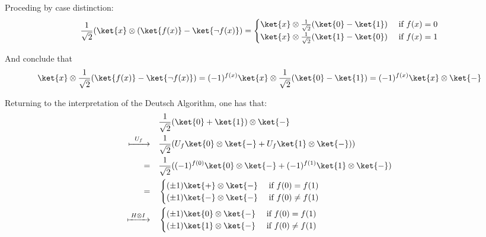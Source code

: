 Proceding by case distinction:
\begin{equation}
  \frac{1}{\sqrt{2}}(\ket{x} \otimes (\ket{f(x)}-\ket{\neg f(x)}) = 
  \begin{cases}
    \ket{x} \otimes \frac{1}{\sqrt{2}}(\ket{0}-\ket{1}) &\text{ if } f(x)=0    \\
    \ket{x} \otimes \frac{1}{\sqrt{2}}(\ket{1}-\ket{0}) &\text{ if }   f(x)= 1 
  \end{cases}
\end{equation}

And conclude that
\begin{equation}
 \ket{x} \otimes  \frac{1}{\sqrt{2}}(\ket{f(x)}-\ket{\neg f(x)}) = (-1)^{f(x)} \ket{x} \otimes \frac{1}{\sqrt{2}}(\ket{0}-\ket{1}) = (-1)^{f(x)} \ket{x} \otimes \ket{-}
\end{equation}

Returning to the interpretation of the Deutsch Algorithm, one has that:
\begin{equation}
\begin{split}
  \quad & \frac{1}{\sqrt{2}}(\ket{0} + \ket{1}) \otimes \ket{-}\\
  \xmapsto{ \hspace{5 pt} U_{f} \hspace{5pt}} \quad & \frac{1}{\sqrt{2}}( U_{f} \ket{0} \otimes \ket{-} + U_{f} \ket{1} \otimes \ket{-})) \\
  = \quad & \frac{1}{\sqrt{2}}( (-1)^{f(0)} \ket{0} \otimes \ket{-} + (-1)^{f(1)} \ket{1} \otimes \ket{-}) \\
  = \quad &
  \begin{cases}
    (\pm 1) \ket{+} \otimes \ket{-} &\text{ if }   f(0)= f(1) \\
    (\pm 1) \ket{-} \otimes \ket{-} &\text{ if }   f(0) \neq f(1)
  \end{cases} \\
  \xmapsto{ \hspace{2pt} H \otimes I \hspace{2pt}} \quad & 
  \begin{cases}
    (\pm 1) \ket{0} \otimes \ket{-} &\text{ if }   f(0)= f(1) \\
    (\pm 1) \ket{1} \otimes \ket{-} &\text{ if }   f(0) \neq f(1)\\
  \end{cases} 
\end{split}
\end{equation}

